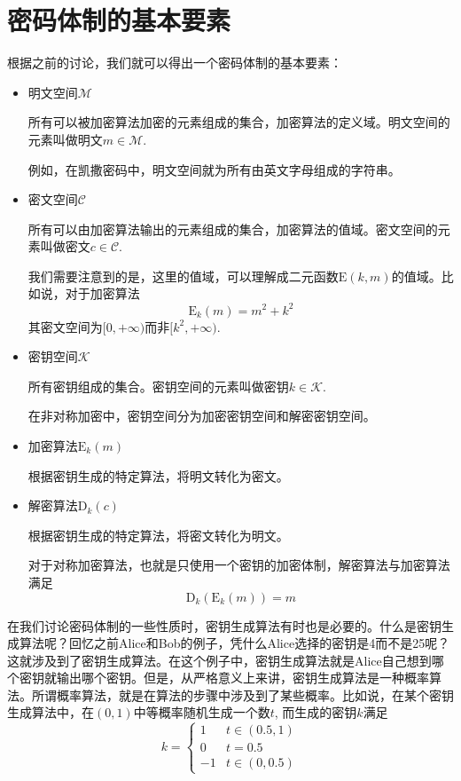 \documentclass[UTF8]{ctexrep}
\def\pth#1{\left( {#1}\right)}
\def\E#1#2{{\mathrm{E}_{#1}\left({#2}\right)}}
\def\D#1#2{{\mathrm{D}_{#1}\left({#2}\right)}}
\begin{document}
\section{密码体制的基本要素}
根据之前的讨论，我们就可以得出一个密码体制的基本要素：
\begin{itemize}
    \item 明文空间$\mathcal{M}$\par
    所有可以被加密算法加密的元素组成的集合，加密算法的定义域。明文空间的元素叫做明文$m\in\mathcal{M}$.\par
    例如，在凯撒密码中，明文空间就为所有由英文字母组成的字符串。
    \item 密文空间$\mathcal{C}$\par
    所有可以由加密算法输出的元素组成的集合，加密算法的值域。密文空间的元素叫做密文$c\in\mathcal{C}$.\par
    我们需要注意到的是，这里的值域，可以理解成二元函数$\mathrm{E}\pth{k, m}$的值域。比如说，对于加密算法
    \[\E{k}{m}=m^2+k^2\]
    其密文空间为$[0, +\infty)$而非$[k^2, +\infty)$.
    \item 密钥空间$\mathcal{K}$\par
    所有密钥组成的集合。密钥空间的元素叫做密钥$k\in\mathcal{K}$.\par
    在非对称加密中，密钥空间分为加密密钥空间和解密密钥空间。
    \item 加密算法$\E{k}{m}$\par
    根据密钥生成的特定算法，将明文转化为密文。
    \item 解密算法$\D{k}{c}$\par
    根据密钥生成的特定算法，将密文转化为明文。\par
    对于对称加密算法，也就是只使用一个密钥的加密体制，解密算法与加密算法满足
    \[\D{k}{\E{k}{m}}=m\]
\end{itemize}

在我们讨论密码体制的一些性质时，密钥生成算法有时也是必要的。什么是密钥生成算法呢？回忆之前Alice和Bob的例子，凭什么Alice选择的密钥是4而不是25呢？这就涉及到了密钥生成算法。在这个例子中，密钥生成算法就是Alice自己想到哪个密钥就输出哪个密钥。但是，从严格意义上来讲，密钥生成算法是一种概率算法。所谓概率算法，就是在算法的步骤中涉及到了某些概率。比如说，在某个密钥生成算法中，在$(0, 1)$中等概率随机生成一个数$t$, 而生成的密钥$k$满足
\[
    k=\begin{cases}1&t\in\pth{0.5, 1}\\0&t=0.5\\-1&t\in\pth{0, 0.5}\end{cases}
\]
\end{document}

